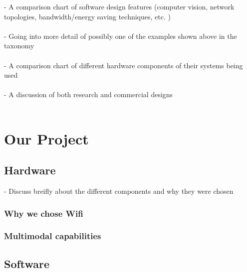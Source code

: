 \documentclass[journal,transmag]{IEEEtran}
\begin{document}
\-- A comparison chart of software design features (computer vision, network
	topologies, bandwidth/energy saving techniques, etc. )\\ \\
\-- Going into more detail of possibly one of the examples shown above in
	the taxonomy\\ \\
\-- A comparison chart of different hardware components of their systems 
	being used\\ \\
\-- A discussion of both research and commercial designs\\ \\

\section{Our Project}

\subsection{Hardware}
 \-- Discuss breifly about the different components and why they were chosen \\

\subsubsection{Why we chose Wifi \\}
\subsubsection{Multimodal capabilities \\}

\subsection{Software}
\end{document}
